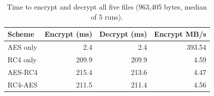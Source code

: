 \begin{table}[htbp]
\centering
\caption{Time to encrypt and decrypt all five files (963,405 bytes, median of 5 runs).}
\label{tab:p3_timing}
\small
\begin{tabular}{lrrr}
\toprule
\textbf{Scheme} & \textbf{Encrypt (ms)} & \textbf{Decrypt (ms)} & \textbf{Encrypt MB/s} \\
\midrule
AES only & 2.4 & 2.4 & 393.54 \\
RC4 only & 209.9 & 209.9 & 4.59 \\
AES-RC4 & 215.4 & 213.6 & 4.47 \\
RC4-AES & 211.5 & 211.4 & 4.56 \\
\bottomrule
\end{tabular}
\end{table}
